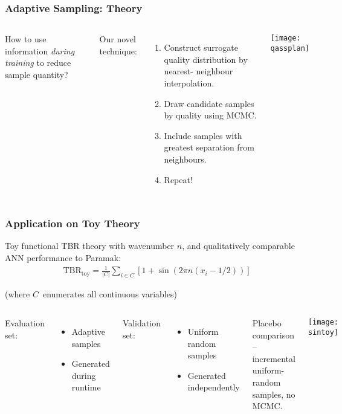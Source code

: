 \begin{frame}
	\frametitle{Adaptive Sampling: Theory}
	 \begin{columns}[onlytextwidth,T]
      \column{\dimexpr\linewidth-6cm-5mm}
        
        How to use information \textit{during training} to reduce sample quantity? \newline
        
		Our \alert{novel technique:}
        \vspace{0em}
        \begin{enumerate}
        \item Construct surrogate quality distribution by nearest- neighbour interpolation.
        \item Draw candidate samples by quality using MCMC.
        \item Include samples with greatest separation from neighbours.
        \item Repeat!
        \end{enumerate}
      \column{6cm}
      \texttt{[image: qassplan]}

    \end{columns}
\end{frame}

\begin{frame}
	\frametitle{Application on Toy Theory}
	Toy functional TBR theory with wavenumber $n$, and qualitatively comparable ANN performance to Paramak:
	\begin{align*}
		\text{TBR}_\text{toy} = \frac{1}{|C|}\sum_{i \in C} \left[1 + \sin(2\pi n (x_i - 1/2)) \right]
	\end{align*}

	\vspace{-1em}
	{\footnotesize
		\hfill(where $C$~enumerates all continuous variables)
	}

	\vspace{1em}

	\begin{columns}[T]
		\column{0.5\paperwidth}
		\vspace{-0.5em}
		Evaluation set:
		\begin{itemize}
		    \item Adaptive samples
		    \item Generated during runtime
		\end{itemize}
		\vspace{0.5em}
		Validation set:
		\begin{itemize}
		    \item Uniform random samples
		    \item Generated independently
		\end{itemize}
		\vspace{15pt}

		Placebo comparison -- incremental uniform-random samples, no MCMC.


		\column{0.4\paperwidth}
		\hspace{-20pt}\texttt{[image: sintoy]}

	\end{columns}
\end{frame}

